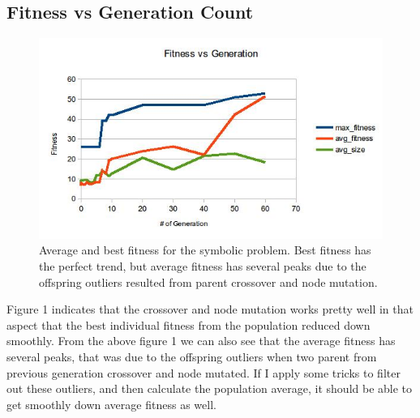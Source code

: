 \documentclass[10pt,b5paper]{article}
\begin{document}
\subsection{Fitness vs Generation Count}
\label{sec-2-1}
\begin{figure}[htb]
\centering
\includegraphics[width=.9\linewidth]{./fig1.jpg}
\caption{Average and best fitness for the symbolic problem. Best fitness has the perfect trend, but average fitness has several peaks due to the offspring outliers resulted from parent crossover and node mutation.}
\end{figure}
Figure 1 indicates that the crossover and node mutation works pretty well in that aspect that the best individual fitness from the population reduced down smoothly. 
From the above figure 1 we can also see that the average fitness has several peaks, that was due to the offspring outliers when two parent from previous generation crossover and node mutated. If I apply some tricks to filter out these outliers, and then calculate the population average, it should be able to get smoothly down average fitness as well.
\end{document}
